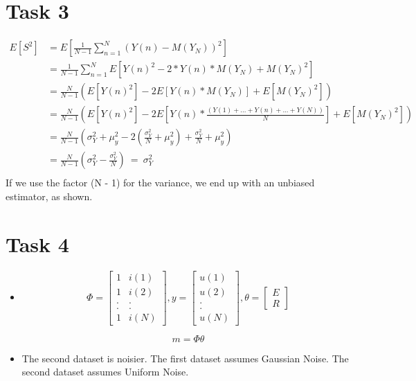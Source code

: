 \documentclass[12pt]{article}
\begin{document}
\section{Task 3}
\begin{equation}
\begin{split}
E[S^2] &= E \left[ \frac{1}{N - 1} \sum_{n = 1}^{N} {(Y(n) - M(Y_N))^2} \right] \\
&= \frac{1}{N - 1} \sum_{n = 1}^{N} E \left[ Y(n)^2 - 2 * Y(n) * M(Y_N) + M(Y_N)^2 \right] \\
&= \frac{N}{N - 1} \left( E[Y(n)^2] - 2E[Y(n) * M(Y_N)] + E[M(Y_N)^2] \right) \\
&= \frac{N}{N - 1} \left( E[Y(n)^2] - 2E \left[ Y(n) * \frac{(Y(1) + ... + Y(n) + ... + Y(N))}{N} \right] + E[M(Y_N)^2] \right) \\
&= \frac{N}{N - 1} \left( \sigma_Y^2 + \mu_y^2 - 2\left( \frac{\sigma_Y^2}{N} + \mu_y^2 \right) + \frac{\sigma_Y^2}{N} + \mu_y^2 \right) \\
&= \frac{N}{N - 1} \left( \sigma_Y^2 - \frac{\sigma_Y^2}{N} \right) \ = \ \sigma_Y^2 \\
\end{split}
\end{equation}
If we use the factor (N - 1) for the variance, we end up with an unbiased estimator, as shown.

\section{Task 4}
\begin{itemize}
\item{
\begin{equation}
\Phi = \begin{bmatrix}
1 & i(1) \\
1 & i(2) \\
. & . \\
. & . \\
1 & i(N)
\end{bmatrix},
y = \begin{bmatrix}
u(1) \\
u(2) \\
. \\
. \\
u(N)
\end{bmatrix},
\theta = \begin{bmatrix}
E \\
R
\end{bmatrix}
\end{equation} 

\begin{equation}
m = \Phi \theta
\end{equation} }

\item{ The second dataset is noisier.
The first dataset assumes Gaussian Noise. The second dataset assumes Uniform Noise.}
\end{itemize}
\end{document}
